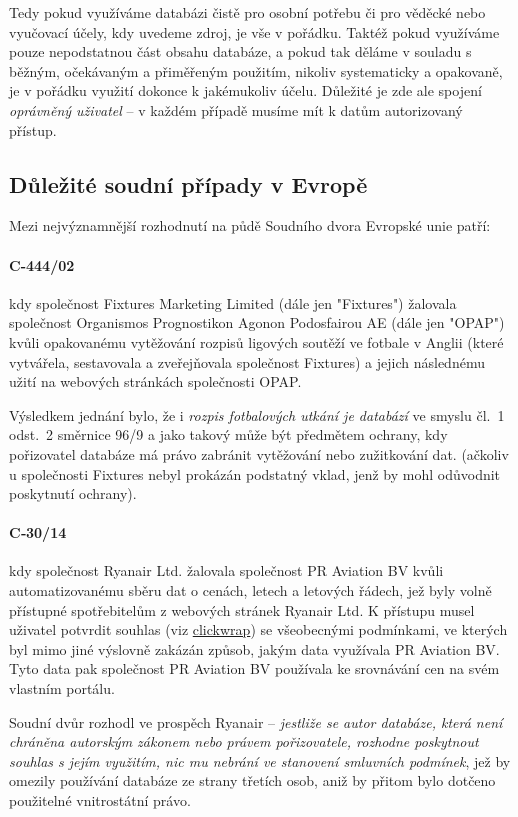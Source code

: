 \documentclass[thesis=B,czech]{FITthesis}[2012/06/26]
\begin{document}
Tedy pokud využíváme databázi čistě pro osobní potřebu či pro věděcké nebo vyučovací účely, kdy uvedeme zdroj, je vše v pořádku. Taktéž pokud využíváme pouze nepodstatnou část obsahu databáze, a pokud tak děláme v souladu s běžným, očekávaným a přiměřeným použitím, nikoliv systematicky a opakovaně, je v pořádku využití dokonce k jakémukoliv účelu. Důležité je zde ale spojení \textit{oprávněný uživatel} -- v každém případě musíme mít k datům autorizovaný přístup.

\subsection{Důležité soudní případy v Evropě}
Mezi nejvýznamnější rozhodnutí na půdě Soudního dvora Evropské unie patří:

\paragraph{C-444/02} kdy společnost Fixtures Marketing Limited (dále jen "Fixtures") žalovala společnost Organismos Prognostikon Agonon Podosfairou AE (dále jen "OPAP") kvůli opakovanému vytěžování rozpisů ligových soutěží ve fotbale v Anglii (které vytvářela, sestavovala a zveřejňovala společnost Fixtures) a jejich následnému užití na webových stránkách společnosti OPAP.\cite{C-444/02_1}

Výsledkem jednání bylo, že i \emph{rozpis fotbalových utkání je databází} ve smyslu čl.~1 odst.~2 směrnice 96/9 a jako takový může být předmětem ochrany, kdy pořizovatel databáze má právo zabránit vytěžování nebo zužitkování dat. (ačkoliv u společnosti Fixtures nebyl prokázán podstatný vklad, jenž by mohl odůvodnit poskytnutí ochrany).\cite{C-444/02_2}

\paragraph{C‑30/14} kdy společnost Ryanair Ltd. žalovala společnost PR Aviation BV kvůli automatizovanému sběru dat o cenách, letech a letových řádech, jež byly volně přístupné spotřebitelům z webových stránek Ryanair Ltd. K přístupu musel uživatel potvrdit souhlas (viz \hyperref[def:clickwrap]{clickwrap}) se všeobecnými podmínkami, ve kterých byl mimo jiné výslovně zakázán způsob, jakým data využívala PR Aviation BV. Tyto data pak společnost PR Aviation BV používala ke srovnávání cen na svém vlastním portálu.\cite{C-30/14}

Soudní dvůr rozhodl ve prospěch Ryanair -- \emph{jestliže se autor databáze, která není chráněna autorským zákonem nebo právem pořizovatele, rozhodne poskytnout souhlas s jejím využitím, nic mu nebrání ve stanovení smluvních podmínek}, jež by omezily používání databáze ze strany třetích osob, aniž by přitom bylo dotčeno použitelné vnitrostátní právo.\cite{C-30/14}
\end{document}
